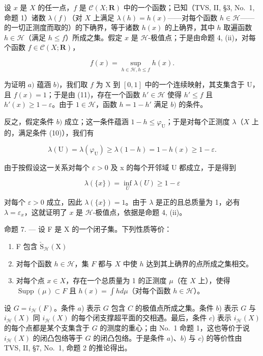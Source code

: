 设 \(x\) 是 \(X\) 的任一点，\(f\) 是 \(\mathcal{C}(X; \mathbf{R})\) 中的一个函数；已知（TVS, II, §3, No.~1, 命题 1）诸数 \(\lambda(f)\)（对 \(X\) 上满足 \(\lambda(h) = h(x)\)——对每个函数 \(h \in \mathcal{H}\)——的一切正测度而取的）的下确界，等于诸数 \(h(x)\) 的上确界，其中 \(h\) 取遍函数 \(h \in \mathcal{H}\)（满足 \(h \leqslant f\)）所成之集。假定 \(x\) 是 \(\mathcal{H}\)-极值点；于是由命题 4, (ii)，对每个函数 \(f \in \mathcal{C}(X; \mathbf{R})\)，

\[
f (x) = \sup _ {h \in \mathscr {H}, h \leqslant f} h (x).\tag{11}
\]

为证明 \(a)\) 蕴涵 \(b)\)，我们取 \(f\) 为 X 到 \([0,1]\) 中的一个连续映射，其支集含于 U，且 \(f(x)=1\)；于是由 (11)，存在一个函数 \(h'\in\mathscr{H}\) 使得 \(h'\leqslant f\) 且 \(h'(x)\geqslant 1-\varepsilon\)。由于 \(1\in\mathscr{H}\)，函数 \(h=1-h'\) 满足 \(b)\) 的条件。

反之，假定条件 \(b)\) 成立；这一条件蕴涵 \(1 - h \leqslant \varphi_{\mathrm{U}}\)；于是对每个正测度 \(\lambda\)（\(X\) 上的，满足条件 (10)），我们有

\[
\lambda (\mathrm{U}) = \lambda (\varphi_ {\mathrm{U}}) \geqslant \lambda (1 - h) = 1 - h (x) \geqslant 1 - \varepsilon .
\]

由于按假设这一关系对每个 \(\varepsilon > 0\) 及 x 的每个开邻域 U 都成立，于是得到

\[
\lambda (\{x \}) = \inf _ {U} \lambda (U) \geqslant 1 - \varepsilon
\]

对每个 \(\varepsilon > 0\) 成立，因此 \(\lambda(\{x\}) = 1\)。由于 \(\lambda\) 是正的且总质量为 1，必有 \(\lambda = \varepsilon_x\)，这就证明了 \(x\) 是 \(\mathcal{H}\)-极值点，依据是命题 4, (ii)。

命题 7. --- 设 F 是 X 的一个闭子集。下列性质等价：

\begin{enumerate}
\def\labelenumi{\alph{enumi})}
\item
  F 包含 \(\check{\mathrm{S}}_{\mathcal{H}}(\mathrm{X})\)
\item
  对每个函数 \(h \in \mathcal{H}\)，集 \(F\) 都与 \(X\) 中使 \(h\) 达到其上确界的点所成之集相交。
\item
  对每个点 \(x \in X\)，存在一个总质量为 1 的正测度 \(\mu\)（在 \(X\) 上），使得 \(\operatorname{Supp}(\mu) \subset F\) 且 \(h(x) = \int h d\mu\)（对每个函数 \(h \in \mathcal{H}\)）。
\end{enumerate}

设 \(G = i_{\mathcal{H}}(F)\)。条件 \(a\)) 表示 \(G\) 包含 \(C\) 的极值点所成之集。条件 \(b\)) 表示 \(G\) 与 \(i_{\mathcal{H}}(X)\) 同 \(i_{\mathcal{H}}(X)\) 的每个闭支撑超平面的交相遇。最后，条件 \(c\)) 表示 \(i_{\mathcal{H}}(X)\) 的每个点都是某个支集含于 \(G\) 的测度的重心；由 No.~1 命题 1，这也等价于说 \(i_{\mathcal{H}}(X)\) 的闭凸包络等于 \(G\) 的闭凸包络。于是条件 \(a\))、\(b\)) 与 \(c\)) 的等价性由 TVS, II, §7, No.~1, 命题 2 的推论得出。

